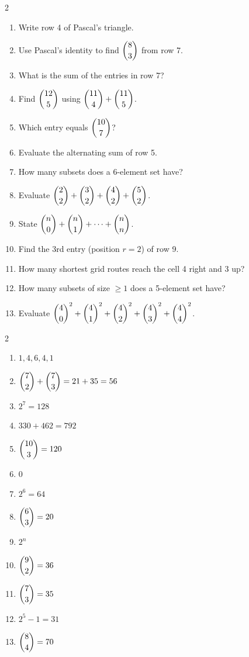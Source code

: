 \documentclass[11pt]{article}
\begin{document}
\begin{recapbox}
\begin{multicols}{2}
\small
\begin{enumerate}[leftmargin=*,itemsep=3pt]
  \item Write row 4 of Pascal's triangle.
  \item Use Pascal's identity to find $\dbinom{8}{3}$ from row 7.
  \item What is the sum of the entries in row 7?
  \item Find $\dbinom{12}{5}$ using $\dbinom{11}{4}+\dbinom{11}{5}$.
  \item Which entry equals $\dbinom{10}{7}$?
  \item Evaluate the alternating sum of row 5.
  \item How many subsets does a 6-element set have?
  \item Evaluate $\dbinom{2}{2}+\dbinom{3}{2}+\dbinom{4}{2}+\dbinom{5}{2}$.
  \item State $\dbinom{n}{0}+\dbinom{n}{1}+\cdots+\dbinom{n}{n}$.
  \item Find the 3rd entry (position $r=2$) of row 9.
  \item How many shortest grid routes reach the cell 4 right and 3 up?
  \item How many subsets of size $\ge1$ does a 5-element set have?
  \item Evaluate $\dbinom{4}{0}^2+\dbinom{4}{1}^2+\dbinom{4}{2}^2+\dbinom{4}{3}^2+\dbinom{4}{4}^2$.
\end{enumerate}
\end{multicols}
\end{recapbox}

\begin{keybox}
\begin{multicols}{2}
\small
\begin{enumerate}[leftmargin=*,itemsep=3pt]
  \item $1,4,6,4,1$
  \item $\dbinom{7}{2}+\dbinom{7}{3}=21+35=56$
  \item $2^7=128$
  \item $330+462=792$
  \item $\dbinom{10}{3}=120$
  \item $0$
  \item $2^6=64$
  \item $\dbinom{6}{3}=20$
  \item $2^n$
  \item $\dbinom{9}{2}=36$
  \item $\dbinom{7}{3}=35$
  \item $2^5-1=31$
  \item $\dbinom{8}{4}=70$
\end{enumerate}
\end{multicols}
\end{keybox}
\end{document}
